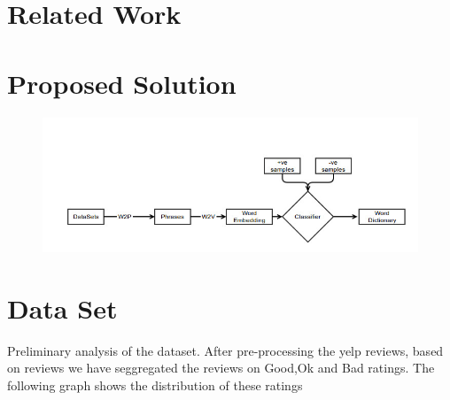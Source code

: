 \documentclass{article} %
\begin{document}
\begin{abstract}


\end{abstract}


\section{Related Work}



\section{Proposed Solution}


\begin{figure}[h]
  \begin{center}
    \includegraphics[scale=0.6]{ml.jpg}
    \label{fig:1}
    \caption{}
  \end{center}
\end{figure}


\section{Data Set}

Preliminary analysis of the dataset. After pre-processing the yelp reviews, based on reviews we have seggregated the reviews on Good,Ok and Bad ratings. The following graph shows the distribution of these ratings
\end{document}
